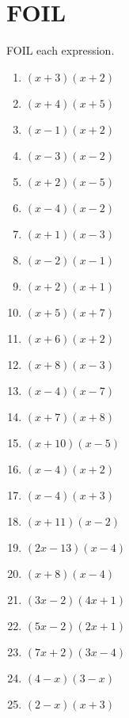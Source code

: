 \documentclass{article}
\begin{document}
\section{FOIL}
FOIL each expression.
\begin{enumerate}
\item $(x+3)(x+2)$
\item $(x+4)(x+5)$
\item $(x-1)(x+2)$
\item $(x-3)(x-2)$
\item $(x+2)(x-5)$
\item $(x-4)(x-2)$
\item $(x+1)(x-3)$
\item $(x-2)(x-1)$
\item $(x+2)(x+1)$
\item $(x+5)(x+7)$
\item $(x+6)(x+2)$
\item $(x+8)(x-3)$
\item $(x-4)(x-7)$
\item $(x+7)(x+8)$
\item $(x+10)(x-5)$
\item $(x-4)(x+2)$
\item $(x-4)(x+3)$
\item $(x+11)(x-2)$
\item $(2x-13)(x-4)$
\item $(x+8)(x-4)$
\item $(3x-2)(4x+1)$
\item $(5x-2)(2x+1)$
\item $(7x+2)(3x-4)$
\item $(4-x)(3-x)$
\item $(2-x)(x+3)$
\end{enumerate}

\newpage
\end{document}
